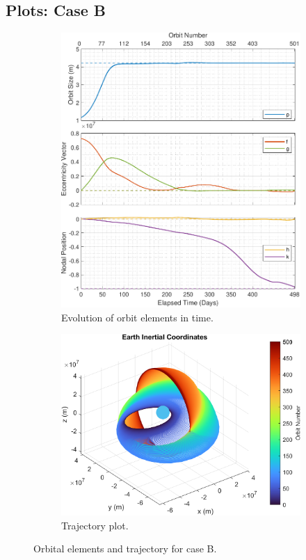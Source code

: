\subsection{Plots: Case B}
\begin{figure}[H]
  \centering
  \begin{subfigure}[t]{0.4\textwidth}
    \includegraphics[width=\textwidth]{figures/oguri_G/orbital_elements.pdf}
    \caption{Evolution of orbit elements in time.}
    \label{fig:results_results_b_a}
  \end{subfigure}
  \begin{subfigure}[t]{0.59\textwidth}
    \includegraphics[width=\textwidth]{figures/oguri_G/trajectory_plot.png}
    \caption{Trajectory plot.}
    \label{fig:results_results_b_b}
  \end{subfigure}
  \caption{Orbital elements and trajectory for case B.}
  \label{fig:results_results_b}
\end{figure}

